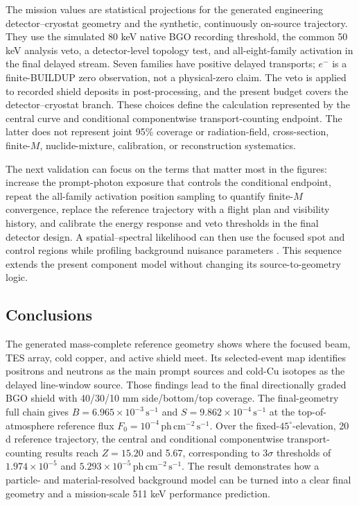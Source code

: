 \documentclass[11pt]{article}
\newcommand{\phcms}{\ensuremath{\,\mathrm{ph\,cm^{-2}\,s^{-1}}}}
\newcommand{\cps}{\ensuremath{\,\mathrm{s^{-1}}}}
\newcommand{\fzero}{F_{0}}
\begin{document}
The mission values are statistical projections for the generated engineering
detector--cryostat geometry and the synthetic, continuously on-source trajectory.
They use the simulated 80 keV native BGO recording threshold, the common 50 keV
analysis veto, a detector-level topology test, and all-eight-family activation in
the final delayed stream. Seven families have positive delayed transports; $e^-$
is a finite-BUILDUP zero observation, not a physical-zero claim. The veto is
applied to recorded shield deposits in post-processing, and the present budget
covers the detector--cryostat branch. These choices define the calculation
represented by the central curve and conditional componentwise transport-counting
endpoint. The latter does not represent joint 95\% coverage or radiation-field,
cross-section, finite-$M$, nuclide-mixture, calibration, or reconstruction
systematics.

The next validation can focus on the terms that matter most in the figures: increase
the prompt-photon exposure that controls the conditional endpoint, repeat the
all-family activation position sampling to quantify finite-$M$ convergence, replace the reference trajectory
with a flight plan and visibility history, and calibrate the energy response and veto
thresholds in the final detector design. A spatial--spectral likelihood can then use
the focused spot and control regions while profiling background nuisance parameters
\cite{Cowan2011}. This sequence extends the present component model without
changing its source-to-geometry logic.

\subsection{Conclusions}
\label{sec:conclusions}

The generated mass-complete reference geometry shows where the focused beam, TES array,
cold copper, and active shield meet. Its selected-event map identifies positrons and
neutrons as the main prompt sources and cold-Cu isotopes as the delayed line-window
source. Those findings lead to the final directionally graded BGO shield with
40/30/10 mm side/bottom/top coverage. The final-geometry full chain gives
$B=6.965\times10^{-3}\cps$ and $S=9.862\times10^{-4}\cps$ at the
top-of-atmosphere reference flux $\fzero=10^{-4}\phcms$. Over the fixed-$45^\circ$-elevation,
20 d reference trajectory, the central and conditional componentwise
transport-counting results reach $Z=15.20$ and 5.67, corresponding to
$3\sigma$ thresholds of $1.974\times10^{-5}$ and
$5.293\times10^{-5}\phcms$. The result demonstrates how a particle- and
material-resolved background model can be turned into a clear final geometry and
a mission-scale 511 keV performance prediction.
\end{document}
